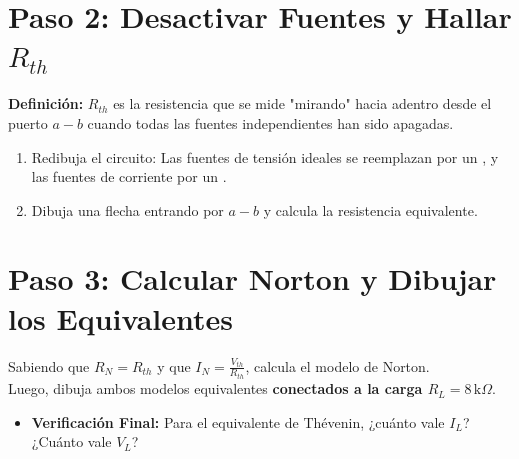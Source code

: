 \documentclass[11pt, a4paper]{article}
\begin{document}
\section*{Paso 2: Desactivar Fuentes y Hallar $R_{th}$}
\textbf{Definición:} $R_{th}$ es la resistencia que se mide "mirando" hacia adentro desde el puerto $a-b$ cuando todas las fuentes independientes han sido apagadas.
\begin{enumerate}
    \item Redibuja el circuito: Las fuentes de tensión ideales se reemplazan por un \underline{\hspace{3cm}}, y las fuentes de corriente por un \underline{\hspace{3cm}}.
    \item Dibuja una flecha entrando por $a-b$ y calcula la resistencia equivalente.
\end{enumerate}
\vspace{4.5cm}

\section*{Paso 3: Calcular Norton y Dibujar los Equivalentes}
Sabiendo que $R_N = R_{th}$ y que $I_N = \frac{V_{th}}{R_{th}}$, calcula el modelo de Norton. \\
Luego, dibuja ambos modelos equivalentes \textbf{conectados a la carga $R_L = 8\,\text{k}\Omega$}.

\vspace{5cm}
\begin{itemize}
    \item \textbf{Verificación Final:} Para el equivalente de Thévenin, ¿cuánto vale $I_L$? ¿Cuánto vale $V_L$?
\end{itemize}
\end{document}
